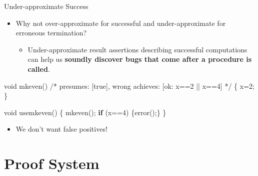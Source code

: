 \documentclass[
  10pt,
  ignorenonframetext,
]{beamer}
\newenvironment{Shaded}{\begin{snugshade}}{\end{snugshade}}
\newcommand{\CommentTok}[1]{\textcolor[rgb]{0.48,0.49,0.49}{#1}}
\newcommand{\ControlFlowTok}[1]{\textcolor[rgb]{0.99,0.74,0.29}{\textbf{#1}}}
\newcommand{\DataTypeTok}[1]{\textcolor[rgb]{0.16,0.50,0.73}{#1}}
\newcommand{\DecValTok}[1]{\textcolor[rgb]{0.96,0.45,0.00}{#1}}
\newcommand{\NormalTok}[1]{\textcolor[rgb]{0.81,0.81,0.76}{#1}}
\newcommand{\OperatorTok}[1]{\textcolor[rgb]{0.81,0.81,0.76}{#1}}
\providecommand{\tightlist}{%
  \setlength{\itemsep}{0pt}\setlength{\parskip}{0pt}}
\begin{document}
\begin{frame}[fragile]{Under-approximate Success}
\label{under-approximate-success}
\begin{itemize}
\tightlist
\item
  Why not over-approximate for successful and under-approximate for
  erroneous termination?

  \begin{itemize}
  \tightlist
  \item
    Under-approximate result assertions describing successful
    computations can help us \textbf{soundly discover bugs that come
    after a procedure is called}.
  \end{itemize}
\end{itemize}

\pause

\begin{Shaded}
\begin{Highlighting}[]
\DataTypeTok{void}\NormalTok{ mkeven}\OperatorTok{()}
\CommentTok{/* presumes: [true], wrong achieves: [ok: x==2 || x==4] */}
\OperatorTok{\{}\NormalTok{ x}\OperatorTok{=}\DecValTok{2}\OperatorTok{;} \OperatorTok{\}}

\DataTypeTok{void}\NormalTok{ usemkeven}\OperatorTok{()}
\OperatorTok{\{}\NormalTok{ mkeven}\OperatorTok{();} \ControlFlowTok{if} \OperatorTok{(}\NormalTok{x}\OperatorTok{==}\DecValTok{4}\OperatorTok{)} \OperatorTok{\{}\NormalTok{error}\OperatorTok{();\}} \OperatorTok{\}}
\end{Highlighting}
\end{Shaded}

\begin{itemize}
\tightlist
\item
  We don't want false positives!
\end{itemize}
\end{frame}

\section{Proof System}\label{proof-system}
\end{document}
